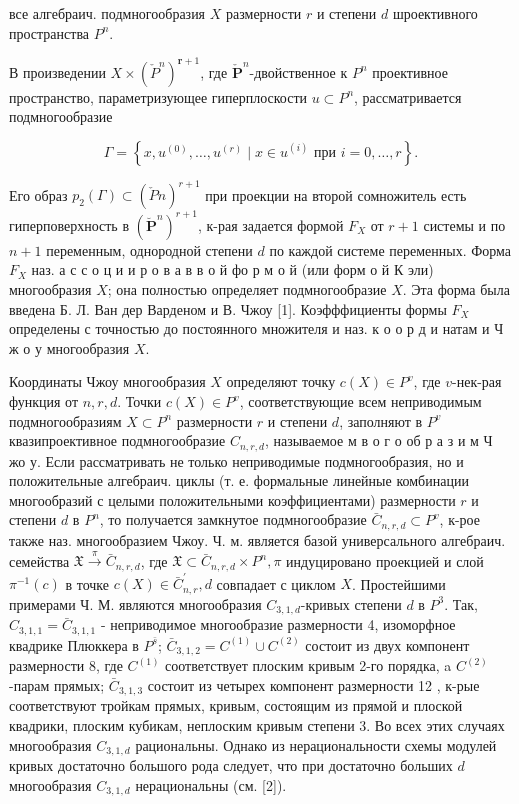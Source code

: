 \documentclass[10pt]{article}
\begin{document}
все алгебраич. подмногообразия $X$ размерности $r$ и степени $d$ шроективного пространства $P^{n}$.



В произведении $X \times\left(\check{P}^{n}\right)^{\boldsymbol{r}+1}$, где $\check{\boldsymbol{P}}^{n}$-двойственное к $P^{n}$ проективное пространство, параметризующее гиперплоскости $u \subset P^{n}$, рассматривается подмногообразие



\[

\Gamma=\left\{x, u^{(0)}, \ldots, u^{(r)} \mid x \in u^{(i)} \text { при } i=0, \ldots, r\right\} .

\]



Его образ $p_{2}(\Gamma) \subset(\check{P} n)^{r+1}$ при проекции на второй сомножитель есть гиперповерхность в $\left(\breve{\boldsymbol{P}}^{n}\right)^{r+1}$, к-рая задается формой $F_{X}$ от $r+1$ системы и по $n+1$ переменным, однородной степени $d$ по каждой системе переменных. Форма $F_{X}$ наз. а с с о ц и и р о в а в в о й фо р м о й (или форм о й К эли) многообразия $X$; она полностью определяет подмногообразие $X$. Эта форма была введена Б. Л. Ван дер Варденом и В. Чжоу [1]. Коэфффициенты формы $F_{X}$ определены с точностью до постоянного множителя и наз. к о о р д и натам и Ч ж о у многообразия $X$.



Координаты Чжоу многообразия $X$ определяют точку $c(X) \in P^{v}$, где $v$-нек-рая функция от $n, r, d$. Точки $c(X) \in P^{v}$, соответствующие всем неприводимым подмногообразиям $X \subset P^{n}$ размерности $r$ и степени $d$, заполняют в $P^{v}$ квазипроективное подмногообразие $C_{n, r, d}$, называемое м в о г о об р а з и м Ч жо у. Если рассматривать не только неприводимые подмногообразия, но и положительные алгебраич. циклы (т. е. формальные линейные комбинации многообразий с целыми положительными коэффициентами) размерности $r$ и степени $d$ в $P^{n}$, то получается замкнутое подмногообразие $\bar{C}_{n, r, d} \subset P^{v}$, к-рое также наз. многообразием Чжоу. Ч. м. является базой универсального алгебраич. семейства $\mathfrak{X} \stackrel{\pi}{\longrightarrow} \bar{C}_{n, r, d}$, где $\mathfrak{X} \subset \bar{C}_{n, r, d} \times P^{n}, \pi$ индуцировано проекцией и слой $\pi^{-1}(c)$ в точке $c(X) \in \bar{C}_{n, r}^{\prime}, d$ совпадает с циклом $X$. Простейшими примерами Ч. М. являются многообразия $C_{3,1, d}$-кривых степени $d$ в $P^{3}$. Так, $C_{3,1,1}=\bar{C}_{3,1,1}$ - неприводимое многообразие размерности 4, изоморфное квадрике Плюккера в $P^{\bar{s}}$; $\bar{C}_{3,1,2}=C^{(1)} \cup C^{(2)}$ состоит из двух компонент размерности 8, где $C^{(1)}$ соответствует плоским кривым 2-го порядка, a $C^{(2)}$-парам прямых; $\bar{C}_{3,1,3}$ состоит из четырех компонент размерности 12 , к-рые соответствуют тройкам прямых, кривым, состоящим из прямой и плоской квадрики, плоским кубикам, неплоским кривым степени 3. Во всех этих случаях многообразия $C_{3,1, d}$ рациональны. Однако из нерациональности схемы модулей кривых достаточно большого рода следует, что при достаточно больших $d$ многообразия $C_{3,1, d}$ нерациональны (см. [2]).
\end{document}
